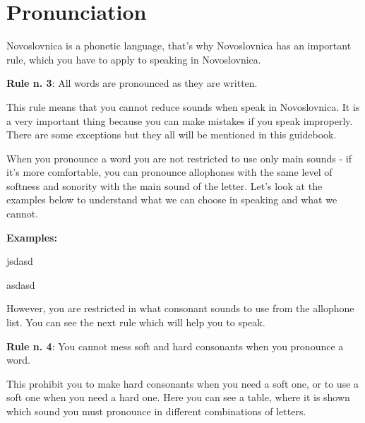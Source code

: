 \section{Pronunciation}

Novoslovnica is a phonetic language, that’s why Novoslovnica has an important rule, which you have to apply to speaking in Novoslovnica.

\textbf{Rule n. 3}: All words are pronounced as they are written.

This rule means that you cannot reduce sounds when speak in Novoslovnica. It is a very important thing because you can make mistakes if you speak improperly. There are some exceptions but they all will be mentioned in this guidebook.

When you pronounce a word you are not restricted to use only main sounds - if it’s more comfortable, you can pronounce allophones with the same level of softness and sonority with the main sound of the letter. Let’s look at the examples below to understand what we can choose in speaking and what we cannot.

\textbf{Examples:}

jsdasd

asdasd

However, you are restricted in what consonant sounds to use from the allophone list. You can see the next rule which will help you to speak.

\textbf{Rule n. 4}: You cannot mess soft and hard consonants when you pronounce a word.

This prohibit you to make hard consonants when you need a soft one, or to use a soft one when you need a hard one. Here you can see a table, where it is shown which sound you must pronounce in different combinations of letters.

